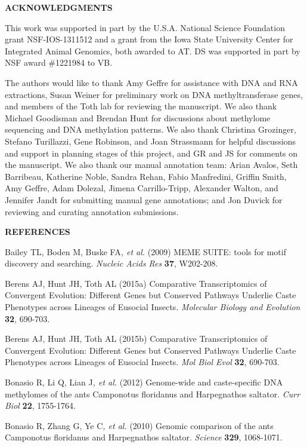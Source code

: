 \documentclass[]{article}
\begin{document}
\textbf{ACKNOWLEDGMENTS}

This work was supported in part by the U.S.A. National Science
Foundation grant NSF-IOS-1311512 and a grant from the Iowa State
University Center for Integrated Animal Genomics, both awarded to AT. DS
was supported in part by NSF award \#1221984 to VB.

The authors would like to thank Amy Geffre for assistance with DNA and
RNA extractions, Susan Weiner for preliminary work on DNA
methyltransferase genes, and members of the Toth lab for reviewing the
manuscript. We also thank Michael Goodisman and Brendan Hunt for
discussions about methylome sequencing and DNA methylation patterns. We
also thank Christina Grozinger, Stefano Turillazzi, Gene Robinson, and
Joan Strassmann for helpful discussions and support in planning stages
of this project, and GR and JS for comments on the manuscript. We also
thank our manual annotation team: Arian Avalos, Seth Barribeau,
Katherine Noble, Sandra Rehan, Fabio Manfredini, Griffin Smith, Amy
Geffre, Adam Dolezal, Jimena Carrillo-Tripp, Alexander Walton, and
Jennifer Jandt for submitting manual gene annotations; and Jon Duvick
for reviewing and curating annotation submissions.

\textbf{REFERENCES}

\protect\hypertarget{ux5fENREFux5f1}{}{}Bailey TL, Boden M, Buske
FA\emph{, et al.} (2009) MEME SUITE: tools for motif discovery and
searching. \emph{Nucleic Acids Res} \textbf{37}, W202-208.

\protect\hypertarget{ux5fENREFux5f2}{}{}Berens AJ, Hunt JH, Toth AL
(2015a) Comparative Transcriptomics of Convergent Evolution: Different
Genes but Conserved Pathways Underlie Caste Phenotypes across Lineages
of Eusocial Insects. \emph{Molecular Biology and Evolution} \textbf{32},
690-703.

\protect\hypertarget{ux5fENREFux5f3}{}{}Berens AJ, Hunt JH, Toth AL
(2015b) Comparative Transcriptomics of Convergent Evolution: Different
Genes but Conserved Pathways Underlie Caste Phenotypes across Lineages
of Eusocial Insects. \emph{Mol Biol Evol} \textbf{32}, 690-703.

\protect\hypertarget{ux5fENREFux5f4}{}{}Bonasio R, Li Q, Lian J\emph{,
et al.} (2012) Genome-wide and caste-specific DNA methylomes of the ants
Camponotus floridanus and Harpegnathos saltator. \emph{Curr Biol}
\textbf{22}, 1755-1764.

\protect\hypertarget{ux5fENREFux5f5}{}{}Bonasio R, Zhang G, Ye C\emph{,
et al.} (2010) Genomic comparison of the ants Camponotus floridanus and
Harpegnathos saltator. \emph{Science} \textbf{329}, 1068-1071.
\end{document}
